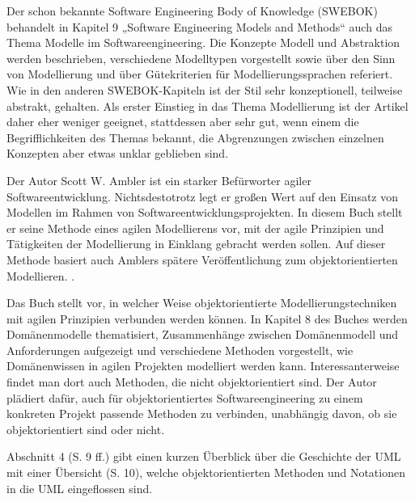 {Der schon bekannte Software Engineering Body of Knowledge (SWEBOK) behandelt in Kapitel 9 „Software Engineering Models and Methods“ auch das Thema Modelle im Softwareengineering. Die Konzepte Modell und Abstraktion werden beschrieben, verschiedene Modelltypen vorgestellt sowie über den Sinn von Modellierung und über Gütekriterien für Modellierungssprachen referiert. Wie in den anderen SWEBOK-Kapiteln ist der Stil sehr konzeptionell, teilweise abstrakt, gehalten. Als erster Einstieg in das Thema Modellierung ist der Artikel daher eher weniger geeignet, stattdessen aber sehr gut, wenn einem die Begrifflichkeiten des Themas bekannt, die Abgrenzungen zwischen einzelnen Konzepten aber etwas unklar geblieben sind.}

{Der Autor Scott W. Ambler ist ein starker Befürworter agiler Softwareentwicklung. Nichtsdestotrotz legt er großen Wert auf den Einsatz von Modellen im Rahmen von Softwareentwicklungsprojekten. In diesem Buch stellt er seine Methode eines agilen Modellierens vor, mit der agile Prinzipien und Tätigkeiten der Modellierung in Einklang gebracht werden sollen. Auf dieser Methode basiert auch Amblers spätere Veröffentlichung zum objektorientierten Modellieren. \cite{amb04}.}

{Das Buch stellt vor, in welcher Weise objektorientierte Modellierungstechniken mit agilen Prinzipien verbunden werden können. In Kapitel 8 des Buches werden
	\linebreak %
	Domänenmodelle thematisiert, Zusammenhänge zwischen Domänenmodell und Anforderungen aufgezeigt und verschiedene Methoden vorgestellt, wie Domänenwissen in agilen Projekten modelliert werden kann. Interessanterweise findet man dort auch Methoden, die nicht objektorientiert sind. Der Autor plädiert dafür, auch für objektorientiertes Softwareengineering zu einem konkreten Projekt passende Methoden zu verbinden, unabhängig davon, ob sie objektorientiert sind oder nicht.}

{Abschnitt 4 (S. 9 ff.) gibt einen kurzen Überblick über die Geschichte der UML mit einer Übersicht (S. 10), welche objektorientierten Methoden und Notationen in die UML eingeflossen sind.}

